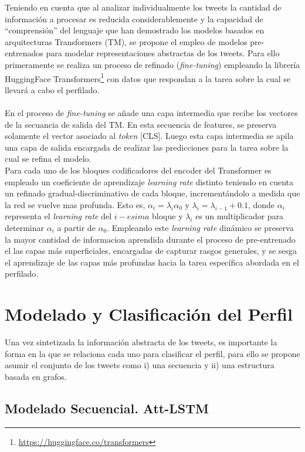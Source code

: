 	Teniendo en cuenta que al analizar individualmente los tweets la cantidad de información a procesar es reducida considerablemente y la capacidad de ``comprensión'' del lenguaje que han demostrado los modelos basados en arquitecturas Transformers (TM), se propone el empleo de modelos pre-entrenados para modelar representaciones abstractas de los tweets. Para ello primeramente se realiza un proceso de refinado (\textit{fine-tuning}) empleando la librería HuggingFace Transformers\footnote{\url{https://huggingface.co/transformers}} con datos que respondan a la tarea sobre la cual se llevará a cabo el perfilado. 
	\\\\
	En el proceso de \textit{fine-tuning} se añade una capa intermedia que recibe los vectores de la secuancia de salida del TM. En esta secuencia de features, se preserva solamente el vector asociado al \textit{token} [CLS]. Luego esta capa intermedia se apila una capa de salida encargada de realizar las predicciones para la tarea sobre la cual  se refina el modelo.
	\\
	Para cada uno de los bloques codificadores del encoder del Transformer es empleado un coeficiente de aprendizaje \textit{learning rate} distinto teniendo en cuenta un refinado gradual-discriminativo de cada bloque, incrementándolo a medida que la red se vuelve mas profunda. Esto es, $\alpha_i = \lambda_i \alpha_0 \text{ y } \lambda_i = \lambda_{i-1} + 0\text{.}1$, donde $\alpha_i$ representa el \textit{learning rate} del $i-esima$ bloque y $\lambda_i$ es un multiplicador para determinar $\alpha_i$ a partir de $\alpha_0$. Empleando este \textit{learning rate} dinámico se preserva la mayor cantidad de informacion aprendida durante el proceso de pre-entrenado el las capas más superficiales, encargadas de capturar rasgos generales, y se sesga el aprendizaje de las capas más profundas hacia la tarea específica abordada en el perfilado.
	\section{Modelado  y Clasificación del Perfil}
	
	Una vez sintetizada la información abstracta de los tweets, es importante la forma en la que se relaciona cada uno para clasificar el perfil, para ello se propone asumir el conjunto de los tweets como i) una secuencia y ii) una estructura basada en grafos.
	
	\subsection{Modelado Secuencial. Att-LSTM}\label{att-lstm}
	
